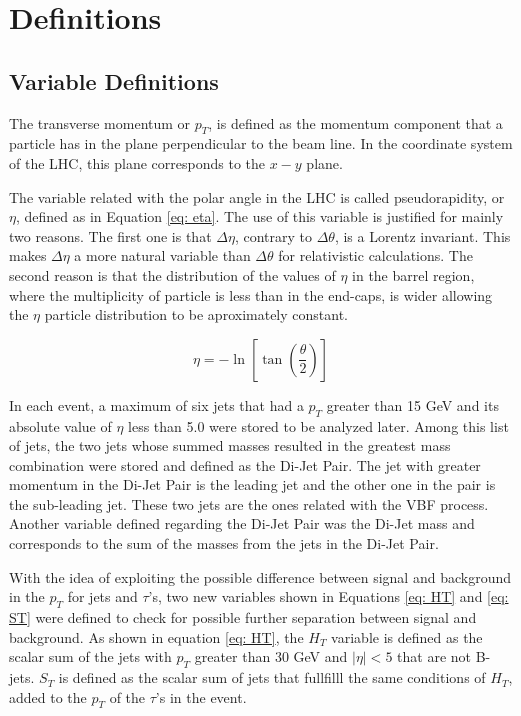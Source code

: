 \chapter{Definitions} \label{sec:definitions}

\section{Variable Definitions}

The transverse momentum or $p_{T}$, is defined as the momentum component that a particle has in the plane perpendicular to the beam line. In the coordinate system of the LHC, this plane corresponds to the $x-y$ plane.

The variable related with the polar angle in the LHC is called pseudorapidity, or $\eta$, defined as in Equation \ref{eq: eta}. The use of this variable is justified for mainly two reasons. The first one is that $\Delta \eta$, contrary to $\Delta \theta$, is a Lorentz invariant. This makes $\Delta \eta$ a more natural variable than $\Delta \theta$ for relativistic calculations. The second reason is that the distribution of the values of $\eta$ in the barrel region, where the multiplicity of particle is less than in the end-caps, is wider allowing the $\eta$ particle distribution to be aproximately constant.

\begin{equation}
 \eta = -\ln\left[\tan\left(\frac{\theta}{2}\right)\right]
 \label{eq: eta}
\end{equation}

In each event, a maximum of six jets that had a $p_{T}$ greater than 15 GeV and its absolute value of $\eta$ less than 5.0 were stored to be analyzed later. Among this list of jets, the two jets whose summed masses resulted in the greatest mass combination were stored and defined as the Di-Jet Pair. The jet with greater momentum in the Di-Jet Pair is the leading jet and the other one in the pair is the sub-leading jet. These two jets are the ones related with the VBF process. Another variable defined regarding the Di-Jet Pair was the Di-Jet mass and corresponds to the sum of the masses from the jets in the Di-Jet Pair.  

With the idea of exploiting the possible difference between signal and background in the $p_{T}$ for jets and $\tau$'s, two new variables shown in Equations \ref{eq: HT} and \ref{eq: ST} were defined to check for possible further separation between signal and background. As shown in equation \ref{eq: HT}, the $H_{T}$ variable is defined as the scalar sum of the jets with $p_{T}$ greater than 30 GeV and $|\eta| < 5$ that are not B-jets. $S_{T}$ is defined as the scalar sum of jets that fullfilll the same conditions of $H_{T}$, added to the $p_{T}$ of the $\tau$'s in the event.

